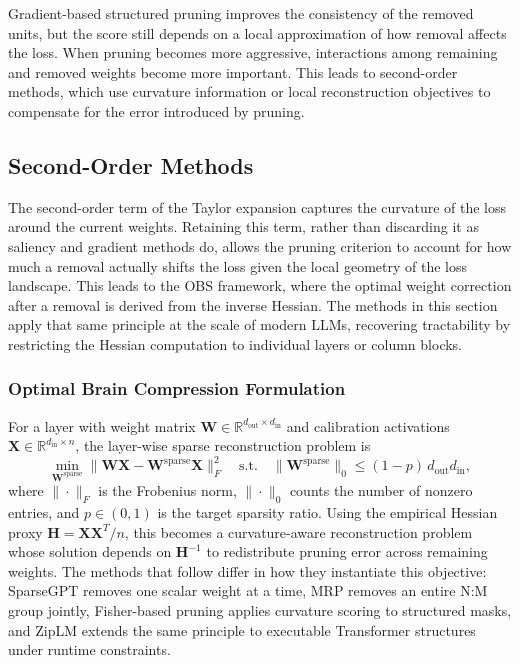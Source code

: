 Gradient-based structured pruning improves the consistency of the removed units, but the score still depends on a local approximation of how removal affects the loss. When pruning becomes more aggressive, interactions among remaining and removed weights become more important. This leads to second-order methods, which use curvature information or local reconstruction objectives to compensate for the error introduced by pruning.

\subsection{Second-Order Methods}

The second-order term of the Taylor expansion captures the curvature of the
loss around the current weights. Retaining this term, rather than discarding it
as saliency and gradient methods do, allows the pruning criterion to account for
how much a removal actually shifts the loss given the local geometry of the loss
landscape. This leads to the OBS framework, where the optimal weight correction
after a removal is derived from the inverse Hessian. The methods in this section
apply that same principle at the scale of modern LLMs, recovering tractability
by restricting the Hessian computation to individual layers or column blocks.

\subsubsection{Optimal Brain Compression Formulation}

For a layer with weight matrix $\mathbf{W} \in \mathbb{R}^{d_{\text{out}} \times d_{\text{in}}}$ and calibration activations $\mathbf{X} \in \mathbb{R}^{d_{\text{in}} \times n}$, the layer-wise sparse reconstruction problem is
\begin{equation}
	\min_{\mathbf{W}^{\text{sparse}}}
	\|\mathbf{W}\mathbf{X} - \mathbf{W}^{\text{sparse}}\mathbf{X}\|_F^2
	\quad \text{s.t.} \quad
	\|\mathbf{W}^{\text{sparse}}\|_0 \leq (1-p)\, d_{\text{out}} d_{\text{in}},
\end{equation}
where $\|\cdot\|_F$ is the Frobenius norm, $\|\cdot\|_0$ counts the number of nonzero entries, and $p \in (0,1)$ is the target sparsity ratio. Using the empirical Hessian proxy $\mathbf{H} = \mathbf{X}\mathbf{X}^T / n$, this becomes a curvature-aware reconstruction problem whose solution depends on $\mathbf{H}^{-1}$ to redistribute pruning error across remaining weights. The methods that follow differ in how they instantiate this objective: SparseGPT removes one scalar weight at a time, MRP removes an entire N:M group jointly, Fisher-based pruning applies curvature scoring to structured masks, and ZipLM extends the same principle to executable Transformer structures under runtime constraints.

